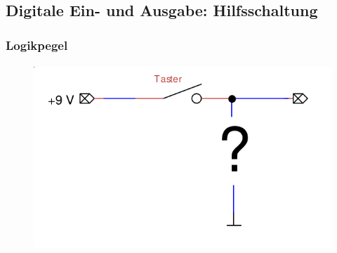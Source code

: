 \subsection{Digitale Ein- und Ausgabe: Hilfsschaltung} %
\label{sub:Digitale Ein- und Ausgabe: Hilfsschaltung}
    \begin{frame}
    \frametitle{Logikpegel}
    \framesubtitle{}
            \begin{figure}[H]
            \begin{center}
                    \includegraphics[scale=0.4]{./img/schaltung/logikpegel_1.png}
            \end{center}
            \end{figure}
    \end{frame}

